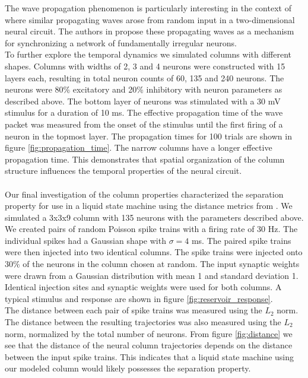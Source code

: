 \documentclass[a4paper,11pt]{article}
\begin{document}
The wave propagation phenomenon is particularly interesting in the context of \cite{keane2015} where similar propagating waves arose from random input in a two-dimensional neural circuit.
The authors in \cite{keane2015} propose these propagating waves as a mechanism for synchronizing a network of fundamentally irregular neurons. 
\\
To further explore the temporal dynamics we simulated columns with different shapes. 
Columns with widths of 2, 3 and 4 neurons were constructed with 15 layers each, resulting in total neuron counts of 60, 135 and 240 neurons.
The neurons were 80\% excitatory and 20\% inhibitory with neuron parameters as described above. 
The bottom layer of neurons was stimulated with a 30 mV stimulus for a duration of 10 ms. 
The effective propagation time of the wave packet was measured from the onset of the stimulus until the first firing of a neuron in the topmost layer.
The propagation times for 100 trials are shown in figure \ref{fig:propagation_time}.
The narrow columns have a longer effective propagation time.
This demonstrates that spatial organization of the column structure influences the temporal properties of the neural circuit.
\\ \\
Our final investigation of the column properties characterized the separation property for use in a liquid state machine using the distance metrics from \cite{maas2002}.
We simulated a 3x3x9 column with 135 neurons with the parameters described above.
We created pairs of random Poisson spike trains with a firing rate of 30 Hz.
The individual spikes had a Gaussian shape with $\sigma=4$ ms.
The paired spike trains were then injected into two identical columns.
The spike trains were injected onto 30\% of the neurons in the column chosen at random.
The input synaptic weights were drawn from a Gaussian distribution with mean 1 and standard deviation 1.
Identical injection sites and synaptic weights were used for both columns. 
A typical stimulus and response are shown in figure \ref{fig:reservoir_response}.\\
The distance between each pair of spike trains was measured using the $L_2$ norm.
The distance between the resulting trajectories was also measured using the $L_2$ norm, normalized by the total number of neurons.
From figure \ref{fig:distance} we see that the distance of the neural column trajectories depends on the distance between the input spike trains.
This indicates that a liquid state machine using our modeled column would likely possesses the separation property.
\end{document}
